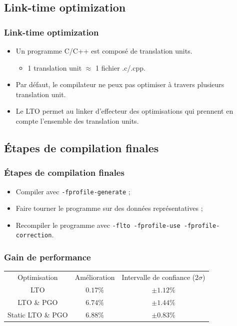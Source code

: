 \documentclass{beamer}
\begin{document}
\subsection{Link-time optimization}

\begin{frame}
    \frametitle{Link-time optimization}

    \begin{itemize}
        \item Un programme C/C++ est composé de translation units.
              \begin{itemize}
                  \item 1 translation unit $ \approx $ 1 fichier .c/.cpp.
              \end{itemize}
        \item Par défaut, le compilateur ne peux pas optimiser à travers plusieurs translation unit.
        \item Le LTO permet au linker d'effecteur des optimisations qui prennent en compte l'ensemble des translation units.
    \end{itemize}
\end{frame}

\subsection{Étapes de compilation finales}

\begin{frame}[fragile]
    \frametitle{Étapes de compilation finales}

    \begin{itemize}
        \item Compiler avec \verb'-fprofile-generate' ;
        \item Faire tourner le programme sur des données représentatives ;
        \item Recompiler le programme avec \verb'-flto -fprofile-use -fprofile-correction'.
    \end{itemize}
\end{frame}

\begin{frame}[fragile]
    \frametitle{Gain de performance}

    \begin{center}
        \begin{tabular}{ c c c }
            Optimisation      & Amélioration & Intervalle de confiance ($2\sigma$) \\
            LTO               & $0.17\%$     & $\pm 1.12\%$                        \\
            LTO \& PGO        & $6.74\%$     & $\pm 1.44\%$                        \\
            Static LTO \& PGO & $6.88\%$     & $\pm 0.83\%$
        \end{tabular}
    \end{center}
\end{frame}
\end{document}
